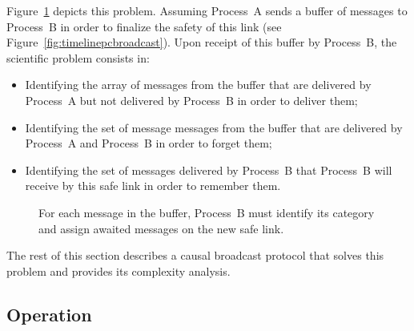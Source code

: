 \begin{problem*}
  Figure~\ref{fig:problemstatement} depicts this problem. Assuming Process~A
  sends a buffer of messages to Process~B in order to finalize the safety of
  this link (see Figure~\ref{fig:timelinepcbroadcast}). Upon receipt of this
  buffer by Process~B, the scientific problem consists in:
  \begin{itemize}[leftmargin=*]
  \item Identifying the array of messages from the buffer that are delivered by
    Process~A but not delivered by Process~B in order to deliver them;
  \item Identifying the set of message messages from the buffer that are
    delivered by Process~A and Process~B in order to forget them;
  \item Identifying the set of messages delivered by Process~B that Process~B will
    receive by this safe link in order to remember them.
  \end{itemize}%
\end{problem*}

\begin{figure}
  \begin{center}
    
    \caption{\label{fig:problemstatement}For each message in the buffer,
      Process~B must identify its category and assign awaited messages on the
      new safe link.}
  \end{center}
\end{figure}


The rest of this section describes a causal broadcast protocol that solves this
problem and provides its complexity analysis.


\subsection{Operation}

